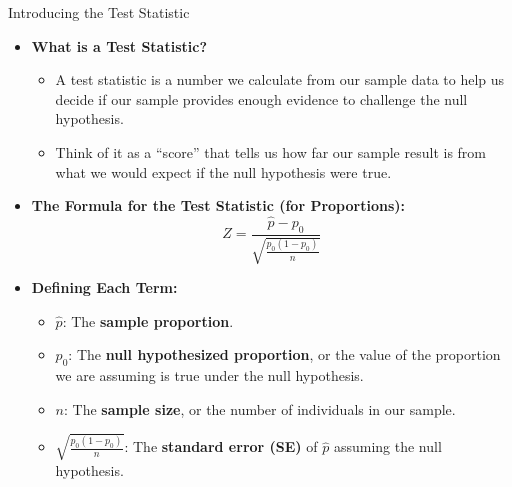 \documentclass[handout]{beamer} %
\begin{document}
\begin{frame}{Introducing the Test Statistic}
    \begin{itemize}
        \item \textbf{What is a Test Statistic?}
        \begin{itemize}
            \item A test statistic is a number we calculate from our sample data to help us decide if our sample provides enough evidence to challenge the null hypothesis.
            \item Think of it as a “score” that tells us how far our sample result is from what we would expect if the null hypothesis were true.
        \end{itemize}

        \item \textbf{The Formula for the Test Statistic (for Proportions):}
\[
        Z = \frac{\hat{p} - p_0}{\sqrt{\frac{p_0(1 - p_0)}{n}}}
\]
        
        \item \textbf{Defining Each Term:}
        \begin{itemize}
            \item $\hat{p}$: The \textbf{sample proportion}.
            \item $p_0$: The \textbf{null hypothesized proportion}, or the value of the proportion we are assuming is true under the null hypothesis.
            \item $n$: The \textbf{sample size}, or the number of individuals in our sample.
            \item $\sqrt{\frac{p_0(1 - p_0)}{n}} $: The \textbf{standard error (SE)} of $\hat{p}$ assuming the null hypothesis.
        \end{itemize}
    \end{itemize}
\end{frame}
\end{document}
